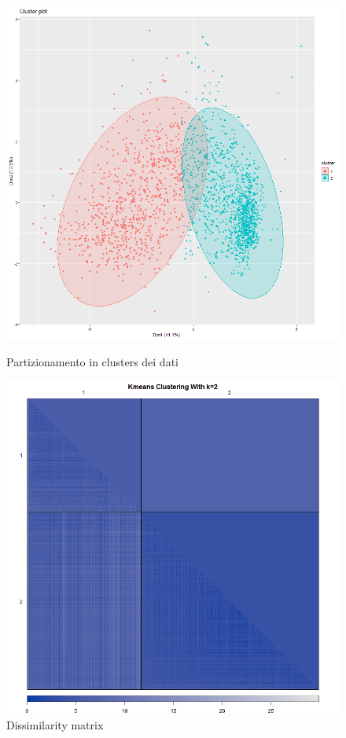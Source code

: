 \documentclass[letterpaper,11pt]{article}
\begin{document}
\begin{figure}[H]
   \begin{minipage}{0.48\textwidth}
     \centering
         \includegraphics[width=1\textwidth]{Img/K-MEANS/KMEANS005.png}
    \caption{Partizionamento in clusters dei dati}
    \label{fig:clusters}
   \end{minipage}\hfill
   \begin{minipage}{0.48\textwidth}
     \centering
     \includegraphics[width=1\linewidth]{Img/K-MEANS/KMEANS006.png}
     \caption{Dissimilarity matrix}\label{fig:dissimilaritymatrix}
   \end{minipage}
\end{figure}
\end{document}
